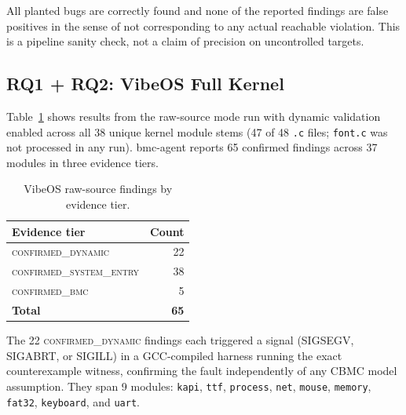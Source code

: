 \documentclass[11pt,a4paper]{article}
\newcommand{\tool}{bmc-agent\xspace}
\newcommand{\dynconf}{\textsc{confirmed\_dynamic}\xspace}
\newcommand{\sysconf}{\textsc{confirmed\_system\_entry}\xspace}
\newcommand{\bmcconf}{\textsc{confirmed\_bmc}\xspace}
\begin{document}
All planted bugs are correctly found and none of the reported findings are
false positives in the sense of not corresponding to any actual reachable
violation. This is a pipeline sanity check, not a claim of precision on
uncontrolled targets.

\subsection{RQ1 + RQ2: VibeOS Full Kernel}

Table~\ref{tab:vibeos-full} shows results from the raw-source mode run with
dynamic validation enabled across all 38 unique kernel module stems (47 of 48
\texttt{.c} files; \texttt{font.c} was not processed in any run). \tool
reports 65 confirmed findings across 37 modules in three evidence tiers.

\begin{table}[t]
\caption{VibeOS raw-source findings by evidence tier.}
\label{tab:vibeos-full}
\begin{tabular}{lr}
\toprule
\textbf{Evidence tier} & \textbf{Count} \\
\midrule
\dynconf{}     & 22  \\
\sysconf{}     & 38 \\
\bmcconf{}     & 5  \\
\midrule
\textbf{Total} & \textbf{65} \\
\bottomrule
\end{tabular}
\end{table}

The 22 \dynconf findings each triggered a signal (SIGSEGV, SIGABRT, or SIGILL)
in a GCC-compiled harness running the exact counterexample witness, confirming
the fault independently of any CBMC model assumption. They span 9 modules:
\texttt{kapi}, \texttt{ttf}, \texttt{process}, \texttt{net}, \texttt{mouse},
\texttt{memory}, \texttt{fat32}, \texttt{keyboard}, and \texttt{uart}.
\end{document}

